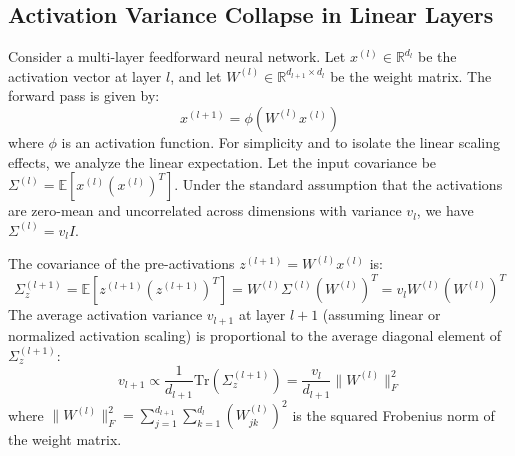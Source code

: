 \documentclass{article}
\theoremstyle{plain}
\theoremstyle{definition}
\theoremstyle{remark}
\begin{document}
\subsection{Activation Variance Collapse in Linear Layers}
Consider a multi-layer feedforward neural network. Let $x^{(l)} \in \mathbb{R}^{d_{l}}$ be the activation vector at layer $l$, and let $W^{(l)} \in \mathbb{R}^{d_{l+1} \times d_{l}}$ be the weight matrix. The forward pass is given by:
\begin{equation}
  x^{(l+1)} = \phi(W^{(l)} x^{(l)})
\end{equation}
where $\phi$ is an activation function. For simplicity and to isolate the linear scaling effects, we analyze the linear expectation. Let the input covariance be $\Sigma^{(l)} = \mathbb{E}[x^{(l)} (x^{(l)})^T]$. Under the standard assumption that the activations are zero-mean and uncorrelated across dimensions with variance $v_l$, we have $\Sigma^{(l)} = v_l I$.

The covariance of the pre-activations $z^{(l+1)} = W^{(l)} x^{(l)}$ is:
\begin{equation}
  \Sigma_z^{(l+1)} = \mathbb{E}[z^{(l+1)} (z^{(l+1)})^T] = W^{(l)} \Sigma^{(l)} (W^{(l)})^T = v_l W^{(l)} (W^{(l)})^T
\end{equation}
The average activation variance $v_{l+1}$ at layer $l+1$ (assuming linear or normalized activation scaling) is proportional to the average diagonal element of $\Sigma_z^{(l+1)}$:
\begin{equation}
  v_{l+1} \propto \frac{1}{d_{l+1}} \text{Tr}(\Sigma_z^{(l+1)}) = \frac{v_l}{d_{l+1}} \|W^{(l)}\|_F^2
\end{equation}
where $\|W^{(l)}\|_F^2 = \sum_{j=1}^{d_{l+1}} \sum_{k=1}^{d_{l}} (W_{jk}^{(l)})^2$ is the squared Frobenius norm of the weight matrix.
\end{document}
